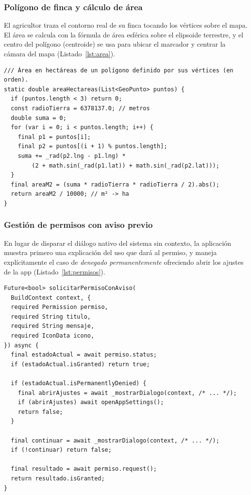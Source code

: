 \documentclass[12pt,a4paper]{article}
\begin{document}
\subsubsection{Polígono de finca y cálculo de área}

El agricultor traza el contorno real de su finca tocando los vértices sobre el
mapa. El área se calcula con la fórmula de área esférica sobre el elipsoide
terrestre, y el centro del polígono (centroide) se usa para ubicar el marcador y
centrar la cámara del mapa (Listado~\ref{lst:area}).

\begin{lstlisting}[caption={Área de un polígono geográfico en hectáreas}, label={lst:area}]
/// Área en hectáreas de un polígono definido por sus vértices (en orden).
static double areaHectareas(List<GeoPunto> puntos) {
  if (puntos.length < 3) return 0;
  const radioTierra = 6378137.0; // metros
  double suma = 0;
  for (var i = 0; i < puntos.length; i++) {
    final p1 = puntos[i];
    final p2 = puntos[(i + 1) % puntos.length];
    suma += _rad(p2.lng - p1.lng) *
        (2 + math.sin(_rad(p1.lat)) + math.sin(_rad(p2.lat)));
  }
  final areaM2 = (suma * radioTierra * radioTierra / 2).abs();
  return areaM2 / 10000; // m² -> ha
}
\end{lstlisting}

\subsubsection{Gestión de permisos con aviso previo}

En lugar de disparar el diálogo nativo del sistema sin contexto, la aplicación
muestra primero una explicación del uso que dará al permiso, y maneja
explícitamente el caso de \textit{denegado permanentemente} ofreciendo abrir los
ajustes de la app (Listado~\ref{lst:permisos}).

\begin{lstlisting}[caption={Solicitud de permiso con aviso previo}, label={lst:permisos}]
Future<bool> solicitarPermisoConAviso(
  BuildContext context, {
  required Permission permiso,
  required String titulo,
  required String mensaje,
  required IconData icono,
}) async {
  final estadoActual = await permiso.status;
  if (estadoActual.isGranted) return true;

  if (estadoActual.isPermanentlyDenied) {
    final abrirAjustes = await _mostrarDialogo(context, /* ... */);
    if (abrirAjustes) await openAppSettings();
    return false;
  }

  final continuar = await _mostrarDialogo(context, /* ... */);
  if (!continuar) return false;

  final resultado = await permiso.request();
  return resultado.isGranted;
}
\end{lstlisting}
\end{document}
